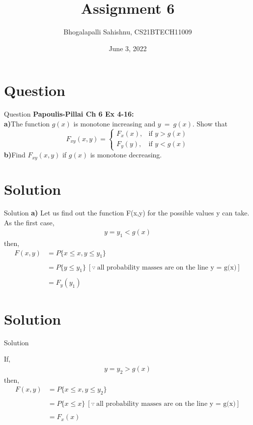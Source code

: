 \documentclass{beamer}
\title{Assignment 6}
\author{Bhogalapalli Sahishnu, CS21BTECH11009}
\date{June 3, 2022}
\begin{document}
\begin{frame}
    \titlepage
\end{frame}

\section{Question}
\begin{frame}{Question}
    \textbf{Papoulis-Pillai Ch 6 Ex 4-16: }\\
    \textbf{a)}The function $g(x)$ is monotone increasing and $y\:=\:g(x)$. Show that 
    \[
    F_{xy}(x,y)=
    \begin{cases}
        F_x(x), &\text{if } y > g(x)\\
        F_y(y), &\text{if } y < g(x) 
    \end{cases}
    \]
    \textbf{b)}Find $F_{xy}(x,y)$ if $g(x)$ is monotone decreasing.
\end{frame}

\section{Solution}
\begin{frame}{Solution}
    \textbf{a)} Let us find out the function F(x,y) for the possible values y can take. As the first case,
    \begin{align}
        y = y_1 < g(x)
    \end{align}
    then,
    \begin{align*}
        F(x,y) &= P\{x \leq x, y \leq y_1\}\\\\
               &= P\{ y \leq y_1\}\: [\because\: \text{all probability masses are on the line y = g(x)}]\\\\
               &= F_y(y_1)
    \end{align*}
\end{frame}
\section{Solution}
\begin{frame}{Solution}
    
If, 
\begin{align}
    y = y_2 > g(x)
\end{align}
then,
\begin{align*}
    F(x,y) &= P\{x \leq x, y \leq y_2\}\\\\
           &= P\{x \leq x\}\: [\because\: \text{all probability masses are on the line y = g(x)}]\\\\
           &= F_x(x)
\end{align*}
\end{frame}
\end{document}
